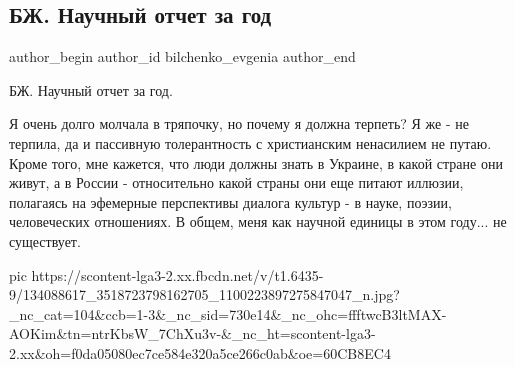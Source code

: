  
 
 
 
 
 
\subsection{БЖ. Научный отчет за год}
\label{sec:31_12_2020.fb.bilchenko_evgenia.1.nauchnyj_otchet_za_god}
\ifcmt
 author_begin
   author_id bilchenko_evgenia
 author_end
\fi

БЖ. Научный отчет за год.

Я очень долго молчала в тряпочку, но почему я должна терпеть? Я же - не
терпила, да и пассивную толерантность с христианским ненасилием не путаю. Кроме
того, мне кажется, что люди должны знать в Украине, в какой стране они живут, а
в России - относительно какой страны они еще питают иллюзии, полагаясь на
эфемерные перспективы диалога культур - в науке, поэзии, человеческих
отношениях. В общем, меня как научной единицы в этом году... не существует.

\ifcmt
  pic https://scontent-lga3-2.xx.fbcdn.net/v/t1.6435-9/134088617_3518723798162705_1100223897275847047_n.jpg?_nc_cat=104&ccb=1-3&_nc_sid=730e14&_nc_ohc=ffftwcB3ltMAX-AOKim&tn=ntrKbsW_7ChXu3v-&_nc_ht=scontent-lga3-2.xx&oh=f0da05080ec7ce584e320a5ce266c0ab&oe=60CB8EC4
\fi

